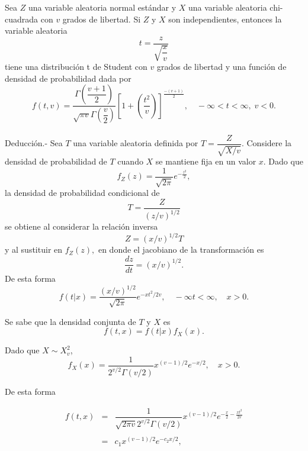 \begin{teo}
    Sea $Z$ una variable aleatoria normal estándar y $X$ una variable aleatoria chi-cuadrada con $v$ grados de libertad. Si $Z$ y $X$ son independientes, entonces la variable aleatoria
$$t=\dfrac{z}{\sqrt{\dfrac{x}{v}}}$$
    tiene una distribución t de Student con $v$ grados de libertad y una función de densidad de probabilidad dada por
    $$f(t,v)=\dfrac{\Gamma\left(\dfrac{v+1}{2}\right)}{\sqrt{\pi v}\Gamma\left(\dfrac{v}{2}\right)}\left[1+\left(\dfrac{t^2}{v}\right)\right]^{\frac{-(v+1)}{2}}, \quad -\infty<t<\infty,\; v<0.$$\\
	Deducción.-\; Sea $T$ una variable aleatoria definida por  $T=\dfrac{Z}{\sqrt{X/v}}$. Considere la densidad de probabilidad  de $T$ cuando $X$ se mantiene fija en un valor $x$. Dado que
	$$f_Z(z)=\dfrac{1}{\sqrt{2\pi}}e^{-\frac{z^2}{2}},$$
	la densidad de probabilidad condicional de 
	$$T=\dfrac{Z}{(z/v)^{1/2}}$$
	se obtiene al considerar la relación inversa
	$$Z=(x/v)^{1/2}T$$
	y al sustituir en $f_Z(z),$ en donde el jacobiano de la transformación es
	$$\dfrac{dz}{dt}=(x/v)^{1/2}.$$
	De esta forma
	$$f(t|x)=\dfrac{(x/v)^{1/2}}{\sqrt{2\pi}}e^{-xt^2/2v},\quad -\infty t<\infty,\quad x>0.$$

	Se sabe que la densidad conjunta de $T$ y $X$ es
	$$f(t,x)=f(t|x)f_X(x).$$

	Dado que $X\sim X_v^2$,
	$$f_X(x)=\dfrac{1}{2^{v/2}\Gamma(v/2)}x^{(v-1)/2}e^{-x/2},\quad x>0.$$

	De esta forma

	$$
	\begin{array}{rcl}
	f(t,x)&=&\dfrac{1}{\sqrt{2\pi v} 2^{v/2}\Gamma(v/2)} x^{(v-1)/2}e^{-\frac{x}{2}-\frac{xt^2}{2v}}\\\\
	      &=& c_1x^{(v-1)/2}e^{-c_2x/2},
	\end{array}
	$$


\end{teo}
